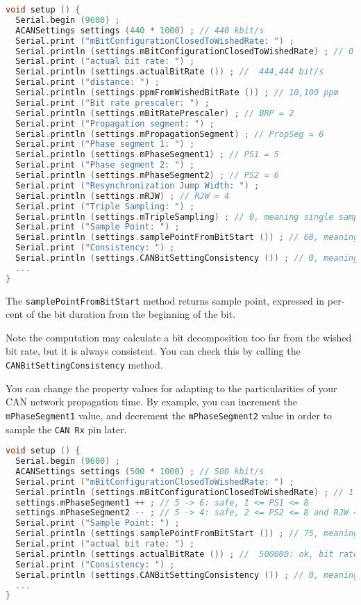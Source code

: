 \documentclass[9pt, a4paper, obeyspaces, openany]{extarticle}
\begin{document}
{ \small\begin{lstlisting}[language=c++]
void setup () {
  Serial.begin (9600) ;
  ACANSettings settings (440 * 1000) ; // 440 kbit/s 
  Serial.print ("mBitConfigurationClosedToWishedRate: ") ;
  Serial.println (settings.mBitConfigurationClosedToWishedRate) ; // 0 (--> is false)
  Serial.print ("actual bit rate: ") ;
  Serial.println (settings.actualBitRate ()) ; //  444,444 bit/s
  Serial.print ("distance: ") ;
  Serial.println (settings.ppmFromWishedBitRate ()) ; // 10,100 ppm
  Serial.print ("Bit rate prescaler: ") ;
  Serial.println (settings.mBitRatePrescaler) ; // BRP = 2
  Serial.print ("Propagation segment: ") ;
  Serial.println (settings.mPropagationSegment) ; // PropSeg = 6
  Serial.print ("Phase segment 1: ") ;
  Serial.println (settings.mPhaseSegment1) ; // PS1 = 5
  Serial.print ("Phase segment 2: ") ;
  Serial.println (settings.mPhaseSegment2) ; // PS2 = 6
  Serial.print ("Resynchronization Jump Width: ") ;
  Serial.println (settings.mRJW) ; // RJW = 4
  Serial.print ("Triple Sampling: ") ;
  Serial.println (settings.mTripleSampling) ; // 0, meaning single sampling
  Serial.print ("Sample Point: ") ;
  Serial.println (settings.samplePointFromBitStart ()) ; // 68, meaning 68%
  Serial.print ("Consistency: ") ;
  Serial.println (settings.CANBitSettingConsistency ()) ; // 0, meaning Ok
  ...
}
\end{lstlisting}}

The \texttt{samplePointFromBitStart} method returns sample point, expressed in per-cent of the bit duration from the beginning of the bit.


Note the computation may calculate a bit decomposition too far from the wished bit rate, but it is always consistent. You can check this by calling the \texttt{CANBitSettingConsistency} method.

You can change the property values for adapting to the particularities of your CAN network propagation time. By example, you can increment the \texttt{mPhaseSegment1} value, and decrement the \texttt{mPhaseSegment2} value in order to sample the \texttt{CAN Rx} pin later.

{ \small\begin{lstlisting}[language=c++]
void setup () {
  Serial.begin (9600) ;
  ACANSettings settings (500 * 1000) ; // 500 kbit/s
  Serial.print ("mBitConfigurationClosedToWishedRate: ") ;
  Serial.println (settings.mBitConfigurationClosedToWishedRate) ; // 1 (--> is true)
  settings.mPhaseSegment1 ++ ; // 5 -> 6: safe, 1 <= PS1 <= 8
  settings.mPhaseSegment2 -- ; // 5 -> 4: safe, 2 <= PS2 <= 8 and RJW <= PS2
  Serial.print ("Sample Point: ") ;
  Serial.println (settings.samplePointFromBitStart ()) ; // 75, meaning 75%
  Serial.print ("actual bit rate: ") ;
  Serial.println (settings.actualBitRate ()) ; //  500000: ok, bit rate did not change
  Serial.print ("Consistency: ") ;
  Serial.println (settings.CANBitSettingConsistency ()) ; // 0, meaning Ok
  ...
}
\end{lstlisting}}
\end{document}
